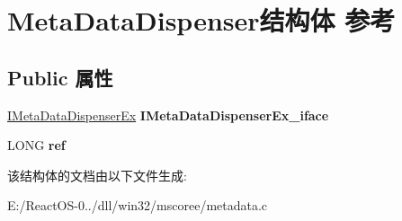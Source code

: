 \hypertarget{struct_meta_data_dispenser}{}\section{Meta\+Data\+Dispenser结构体 参考}
\label{struct_meta_data_dispenser}
\subsection*{Public 属性}
\begin{DoxyCompactItemize}
\item 
\mbox{\label{struct_meta_data_dispenser_a1c1bdafa24ed152317fe856825d77dfa}} 
\hyperlink{interface_i_meta_data_dispenser_ex}{I\+Meta\+Data\+Dispenser\+Ex} {\bfseries I\+Meta\+Data\+Dispenser\+Ex\+\_\+iface}
\item 
\mbox{\label{struct_meta_data_dispenser_a02337b6523c9d1d844555b7d1788efc0}} 
L\+O\+NG {\bfseries ref}
\end{DoxyCompactItemize}


该结构体的文档由以下文件生成\+:\begin{DoxyCompactItemize}
\item 
E\+:/\+React\+O\+S-\/0../dll/win32/mscoree/metadata.\+c\end{DoxyCompactItemize}
